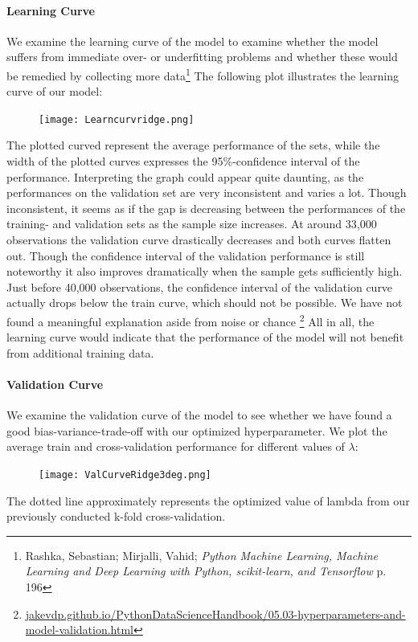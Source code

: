 \documentclass[12pt,a4paper]{article}
\begin{document}
\paragraph{Learning Curve}
We examine the learning curve of the model to examine whether the model suffers from immediate over- or underfitting problems and whether these would be remedied by collecting more data\footnote{Rashka, Sebastian; Mirjalli, Vahid; \textit{Python Machine Learning, Machine Learning and Deep Learning with Python, scikit-learn, and Tensorflow} p. 196}
The following plot illustrates the learning curve of our model:
\begin{figure}[H]
\centering
\caption{}
\texttt{[image: Learncurvridge.png]}
\end{figure}
The plotted curved represent the average performance of the sets, while the width of the plotted curves expresses the 95\%-confidence interval of the performance.  
Interpreting the graph could appear quite daunting, as the performances on the validation set are very inconsistent and varies a lot. Though inconsistent, it seems as if the gap is decreasing between the performances of the training- and validation sets as the sample size increases. 
At around 33,000 observations the validation curve drastically decreases and both curves flatten out. Though the confidence interval of the validation performance is still noteworthy it also improves dramatically when the sample gets sufficiently high. Just before 40,000 observations, the confidence interval of the validation curve actually drops below the train curve, which should not be possible. We have not found a meaningful explanation aside from noise or chance \footnote{\href{https://jakevdp.github.io/PythonDataScienceHandbook/05.03-hyperparameters-and-model-validation.html}{jakevdp.github.io/PythonDataScienceHandbook/05.03-hyperparameters-and-model-validation.html}} 
All in all, the learning curve would indicate that the performance of the model will not benefit from additional training data. 

\paragraph{Validation Curve}
We examine the validation curve of the model to see whether we have found a good bias-variance-trade-off with our optimized hyperparameter. We plot the average train and cross-validation performance for different values of $\lambda$: 
\begin{figure}[H]
\centering
\caption{}
\texttt{[image: ValCurveRidge3deg.png]}
\end{figure}
The dotted line approximately represents the optimized value of lambda from our previously conducted k-fold cross-validation. 
\end{document}
